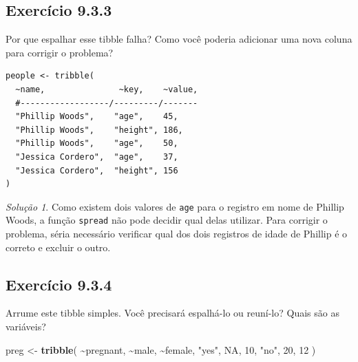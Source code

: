 \documentclass[
]{latex/krantz}
\newenvironment{Shaded}{\begin{snugshade}}{\end{snugshade}}
\newcommand{\ConstantTok}[1]{\textcolor[rgb]{0.56,0.35,0.01}{#1}}
\newcommand{\DecValTok}[1]{\textcolor[rgb]{0.00,0.00,0.81}{#1}}
\newcommand{\FunctionTok}[1]{\textcolor[rgb]{0.13,0.29,0.53}{\textbf{#1}}}
\newcommand{\NormalTok}[1]{#1}
\newcommand{\OtherTok}[1]{\textcolor[rgb]{0.56,0.35,0.01}{#1}}
\newcommand{\SpecialCharTok}[1]{\textcolor[rgb]{0.81,0.36,0.00}{\textbf{#1}}}
\newcommand{\StringTok}[1]{\textcolor[rgb]{0.31,0.60,0.02}{#1}}
\theoremstyle{definition}
\theoremstyle{definition}
\theoremstyle{definition}
\theoremstyle{definition}
\theoremstyle{remark}
\newtheorem*{solution}{Solução}
\begin{document}
\hypertarget{exr9-3-3}{%
\subsection*{Exercício 9.3.3}\label{exr9-3-3}}

Por que espalhar esse tibble falha? Como você poderia adicionar uma nova coluna para corrigir o problema?

\begin{verbatim}
people <- tribble(
  ~name,               ~key,    ~value,
  #------------------/---------/-------
  "Phillip Woods",    "age",    45,
  "Phillip Woods",    "height", 186,
  "Phillip Woods",    "age",    50,
  "Jessica Cordero",  "age",    37,
  "Jessica Cordero",  "height", 156
)
\end{verbatim}

\begin{solution}
Como existem dois valores de \texttt{age} para o registro em nome de Phillip Woods, a função \texttt{spread} não pode decidir qual delas utilizar. Para corrigir o problema, séria necessário verificar qual dos dois registros de idade de Phillip é o correto e excluir o outro.
\end{solution}

\hypertarget{exr9-3-4}{%
\subsection*{Exercício 9.3.4}\label{exr9-3-4}}

Arrume este tibble simples. Você precisará espalhá-lo ou reuní-lo? Quais são as variáveis?

\begin{Shaded}
\begin{Highlighting}[]
\NormalTok{preg }\OtherTok{\textless{}{-}} \FunctionTok{tribble}\NormalTok{(}
  \SpecialCharTok{\textasciitilde{}}\NormalTok{pregnant,    }\SpecialCharTok{\textasciitilde{}}\NormalTok{male,    }\SpecialCharTok{\textasciitilde{}}\NormalTok{female,}
  \StringTok{"yes"}\NormalTok{,        }\ConstantTok{NA}\NormalTok{,       }\DecValTok{10}\NormalTok{,}
  \StringTok{"no"}\NormalTok{,         }\DecValTok{20}\NormalTok{,       }\DecValTok{12}
\NormalTok{)}
\end{Highlighting}
\end{Shaded}
\end{document}
